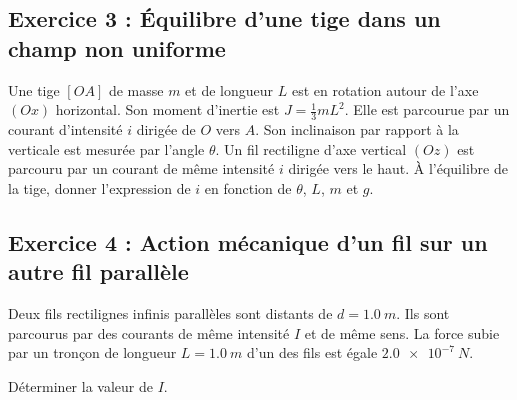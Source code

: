 \subsection{Exercice 3 : Équilibre d'une tige dans un champ non uniforme}

Une tige $[OA]$ de masse $m$ et de longueur $L$ est en rotation autour de l'axe $(Ox)$ horizontal. Son moment d'inertie est $J = \frac{1}{3} m L^2$. Elle est parcourue par un courant d'intensité $i$ dirigée de $O$ vers $A$. Son inclinaison par rapport à la verticale est mesurée par l'angle $\theta$. Un fil rectiligne d'axe vertical $(Oz)$ est parcouru par un courant de même intensité $i$ dirigée vers le haut. À l'équilibre de la tige, donner l'expression de $i$ en fonction de $\theta$, $L$, $m$ et $g$. 


\subsection{Exercice 4 : Action mécanique d'un fil sur un autre fil parallèle}

Deux ﬁls rectilignes inﬁnis parallèles sont distants de $d = \SI{1.0}{m}$. Ils sont parcourus par des courants de même intensité $I$ et de même sens. La force subie par un tronçon de longueur $L = \SI{1.0}{m}$ d’un des ﬁls est égale $\SI{2.0e-7}{N}$.

Déterminer la valeur de $I$.
